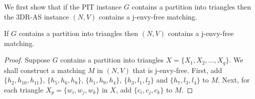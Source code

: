 We first show that if the PIT instance $G$ contains a partition into triangles then the 3DR-AS instance $(N, V)$ contains a j-envy-free matching.

\begin{lem}
\label{lem:threed_efr_as_jef_first_direction}
If $G$ contains a partition into triangles then $(N, V)$ contains a j-envy-free matching.
\end{lem}
\begin{proof}
Suppose $G$ contains a partition into triangles $X = \{ X_1, X_2, \dots, X_q \}$. We shall construct a matching $M$ in $(N, V)$ that is j-envy-free. First, add $\{ h_2, h_{10}, h_{11} \}$, $\{ h_5, h_6, h_8 \}$, $\{ h_1, h_9, h_4 \}$, $\{ h_3, l_1, l_2 \}$ and $\{ h_7, l_3, l_4 \}$ to $M$. Next, for each triangle $X_p = \{ w_i, w_j, w_k \}$ in $X$, add $\{ c_i, c_j, c_k \}$ to $M$.


\end{proof}
